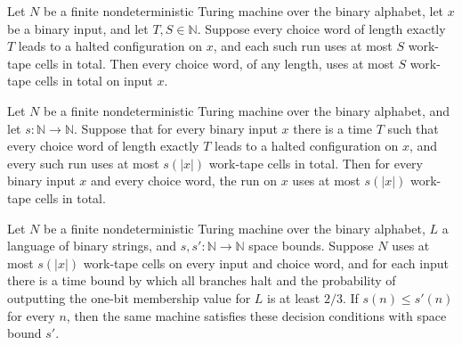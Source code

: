\begin{theorem}
\label{Turing.FinNDTM.spaceUsedWith_le_of_haltsWithin}
\leanok
{}
Let $N$ be a finite nondeterministic Turing machine over the binary alphabet, let $x$ be
a binary input, and let $T,S\in\mathbb{N}$. Suppose every choice word of length exactly
$T$ leads to a halted configuration on $x$, and each such run uses at most $S$ work-tape
cells in total. Then every choice word, of any length, uses at most $S$ work-tape cells
in total on input $x$.
\end{theorem}

\begin{theorem}
\label{Turing.FinNDTM.usesSpace_of_haltsWithin}
\leanok
{}
Let $N$ be a finite nondeterministic Turing machine over the binary alphabet, and let
$s:\mathbb{N}\to\mathbb{N}$. Suppose that for every binary input $x$ there is a time $T$
such that every choice word of length exactly $T$ leads to a halted configuration on
$x$, and every such run uses at most $s(|x|)$ work-tape cells in total. Then for every
binary input $x$ and every choice word, the run on $x$ uses at most $s(|x|)$ work-tape
cells in total.
\end{theorem}

\begin{theorem}
\label{Turing.FinNDTM.BPDecidesInSpace.mono}
\leanok
{}
Let $N$ be a finite nondeterministic Turing machine over the binary alphabet, $L$ a
language of binary strings, and $s,s':\mathbb{N}\to\mathbb{N}$ space bounds. Suppose $N$
uses at most $s(|x|)$ work-tape cells on every input and choice word, and for each input
there is a time bound by which all branches halt and the probability of outputting the
one-bit membership value for $L$ is at least $2/3$. If $s(n)\le s'(n)$ for every $n$,
then the same machine satisfies these decision conditions with space bound $s'$.
\end{theorem}

